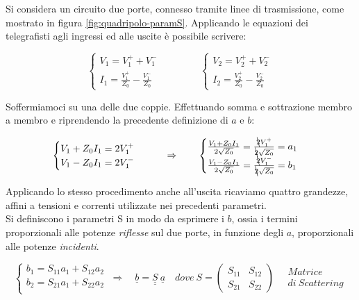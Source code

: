 Si considera un circuito due porte, connesso tramite linee di trasmissione, come mostrato in figura \ref{fig:quadripolo-paramS}. Applicando le equazioni dei telegrafisti agli ingressi ed alle uscite è possibile scrivere:

$$
\begin{cases}
V_1 = V_1^+ + V_1^-\\
I_1 = \frac{V_1^+}{Z_0} - \frac{V_1^-}{Z_0}
\end{cases}
\qquad\qquad
\begin{cases}
V_2 = V_2^+ + V_2^-\\
I_2 = \frac{V_2^+}{Z_0} - \frac{V_2^-}{Z_0}
\end{cases}
$$

Soffermiamoci su una delle due coppie. Effettuando somma e sottrazione membro a membro e riprendendo la precedente definizione di $a$ e $b$:

\begin{equation}
\begin{cases}
V_1 + Z_0 I_1 = 2V_1^+\\
V_1 - Z_0 I_1 = 2V_1^-
\end{cases}
\qquad
\Rightarrow
\qquad
\begin{cases}
\frac{V_1 + Z_0 I_1}{2\sqrt{Z_0}} = \frac{\bcancel{2}V_1^+}{\bcancel{2}\sqrt{Z_0}} = a_1\\
\frac{V_1 - Z_0 I_1}{2\sqrt{Z_0}} = \frac{\bcancel{2}V_1^-}{\bcancel{2}\sqrt{Z_0}} = b_1
\end{cases}
\label{eq:prog_regr}
\end{equation}

Applicando lo stesso procedimento anche all'uscita ricaviamo quattro grandezze, affini a tensioni e correnti utilizzate nei precedenti parametri.\\
Si definiscono i parametri S in modo da esprimere i $b$, ossia i termini proporzionali alle potenze \textit{riflesse} sul due porte, in funzione degli $a$, proporzionali alle potenze \textit{incidenti}. 

\begin{equation}
\begin{cases}
b_1 = S_{11} a_1 + S_{12}a_2\\
b_2 = S_{21} a_1 + S_{22}a_2\\
\end{cases}
\ 
\Rightarrow
\quad
\underline{b} = \underline{\underline{S}}~ \underline{a}
\quad
dove
\ 
S =
\left(
\begin{array}{cc}
S_{11} & S_{12}\\
S_{21} & S_{22}
\end{array}
\right)
\quad
\begin{array}{c}
Matrice\\
di~Scattering
\end{array}
\label{eq:scattering}
\end{equation}


